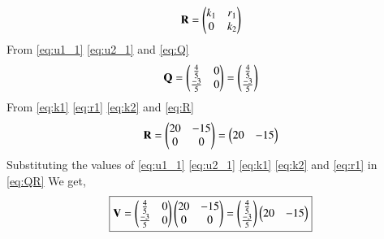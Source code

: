 \documentclass[journal,12pt,twocolumn]{IEEEtran}
\begin{document}
\begin{align}
 \mathbf{R}=\begin{pmatrix}k_1 & r_1 \\ 0 & k_2\end{pmatrix}  \label{eq:R}
\end{align}
From \eqref{eq:u1_1} \eqref{eq:u2_1} and \eqref{eq:Q}
\begin{align}
 \mathbf{Q}=\begin{pmatrix}\frac{4}{5}& 0 \\ \frac{-3}{5}& 0\end{pmatrix}=\begin{pmatrix}\frac{4}{5}\\ \frac{-3}{5}\end{pmatrix}  \label{eq:Q_1}
\end{align}
From \eqref{eq:k1} \eqref{eq:r1} \eqref{eq:k2} and \eqref{eq:R}
\begin{align}
 \mathbf{R}=\begin{pmatrix}20 & -15 \\ 0 & 0\end{pmatrix}=\begin{pmatrix}20 & -15\end{pmatrix}  \label{eq:R_1}
\end{align}
Substituting the values of \eqref{eq:u1_1} \eqref{eq:u2_1} \eqref{eq:k1} \eqref{eq:k2} and \eqref{eq:r1} in \eqref{eq:QR} 
We get,
\begin{align}
 \boxed{\mathbf{V}=\begin{pmatrix}\frac{4}{5} & 0 \\ \frac{-3}{5} & 0\end{pmatrix} \begin{pmatrix}20 & -15 \\ 0 & 0\end{pmatrix}=\begin{pmatrix}\frac{4}{5}\\ \frac{-3}{5}\end{pmatrix}\begin{pmatrix}20 & -15\end{pmatrix}}  \label{eq:V=QR}
\end{align}
\end{document}
